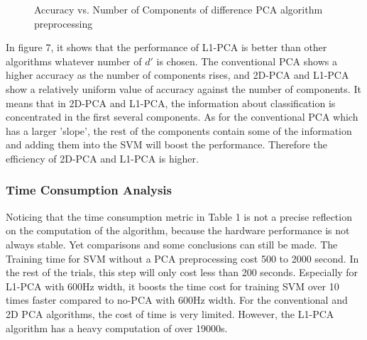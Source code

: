 \documentclass{cta-author}
\begin{document}
\begin{figure}[!t]
{}
\caption{Accuracy vs. Number of Components of difference PCA algorithm preprocessing}
\end{figure}
In figure 7, it shows that the performance of L1-PCA is better than other algorithms whatever number of $d'$ is chosen.
The conventional PCA shows a higher accuracy as the number of components rises, and 2D-PCA and L1-PCA show a relatively uniform value of accuracy against the number of components.
It means that in 2D-PCA and L1-PCA, the information about classification is concentrated in the first several components. As for the conventional PCA which has a larger 'slope', the rest of the components contain some of the information and adding them into the SVM will boost the performance.
Therefore the efficiency of 2D-PCA and L1-PCA is higher.
\subsubsection{Time Consumption Analysis}
Noticing that the time consumption metric in Table 1 is not a precise reflection on the computation of the algorithm, because the hardware performance is not always stable. Yet comparisons and some conclusions can still be made.
The Training time for SVM without a PCA preprocessing cost 500 to 2000 second. In the rest of the trials, this step will only cost less than 200 seconds. Especially for L1-PCA with 600Hz width, it boosts the time cost for training SVM over 10 times faster compared to no-PCA with 600Hz width.
For the conventional and 2D PCA algorithms, the cost of time is very limited. However, the L1-PCA algorithm has a heavy computation of over 19000s.
\end{document}
